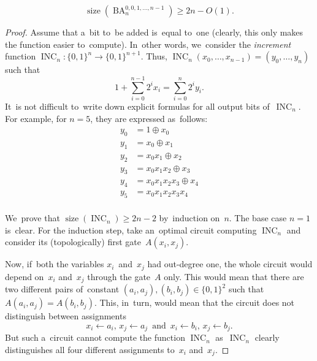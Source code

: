 \documentclass[a4paper, UKenglish, cleveref, autoref,  thm-restate, anonymous]{lipics-v2021}
\DeclareMathOperator{\BA}{BA}
\DeclareMathOperator{\INC}{INC}
\DeclareMathOperator{\size}{size}
\begin{document}
    \begin{theorem}
        \label{theorem:lowerbound}
        \[\size(\BA_n^{0,0,1,\dotsc,n-1}) \ge 2n-O(1).\]
    \end{theorem}
    \begin{proof}
        Assume that a~bit to~be added is~equal to~one (clearly, this only makes the function easier to~compute). In~other words,
        we~consider the \emph{increment} function $\INC_n \colon \{0,1\}^n \to \{0,1\}^{n+1}$. Thus, $\INC_n(x_0, \dotsc, x_{n-1})=(y_0, \dotsc, y_n)$ such that
        \[1+\sum_{i=0}^{n-1}2^ix_i=\sum_{i=0}^n2^iy_i.\]
        It~is not difficult to~write down explicit formulas for all output bits of~$\INC_n$. For example, for $n=5$, they are expressed as~follows:
        \begin{align*}
            y_0 &= 1 \oplus x_0\\
            y_1 &= x_0 \oplus x_1\\
            y_2 &= x_0x_1 \oplus x_2\\
            y_3 &= x_0x_1x_2 \oplus x_3\\
            y_4 &= x_0x_1x_2x_3 \oplus x_4\\
            y_5 &= x_0x_1x_2x_3x_4\\
        \end{align*}

        We~prove that $\size(\INC_n) \ge 2n-2$ by~induction on~$n$.
        The base case $n=1$ is~clear. For the induction step, take an~optimal circuit computing $\INC_n$ and consider its (topologically) first gate~$A(x_i, x_j)$.

        Now, if~both the variables $x_i$~and~$x_j$ had out-degree one, the whole circuit would depend on~$x_i$ and~$x_j$ through the gate~$A$ only. This would mean that there are two different pairs of~constant $(a_i, a_j), (b_i, b_j) \in \{0,1\}^2$ such that $A(a_i, a_j)=A(b_i, b_j)$. This, in~turn, would mean that the circuit does not distinguish between assignments
        \[x_i \gets a_i,\, x_j \gets a_j \,\text{ and }\, x_i \gets b_i,\, x_j \gets b_j.\]
        But such a~circuit cannot compute the function $\INC_n$ as~$\INC_n$ clearly distinguishes all four different assignments to~$x_i$ and~$x_j$.


\end{proof}
\end{document}
